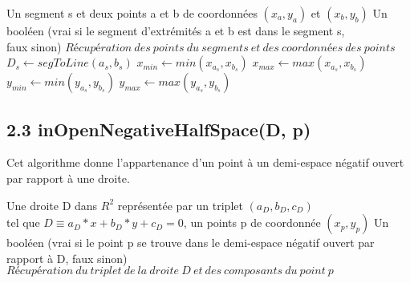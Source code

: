 \documentclass[a4paper,12pt]{report}	%
\begin{document}
	\begin{algorithm}
	\caption{$inSegment(s, a, b)$}
	\label{Modele pour un algo}
	\begin{algorithmic} [1]
	\REQUIRE Un segment s et deux points a et  b de coordonnées $(x_{a}, y_{a})$ et $(x_{b}, y_{b})$
	\ENSURE Un booléen (vrai si le segment d’extrémités a et b est dans le segment s, \\faux sinon)
	\STATE $Récupération\ des\ points\ du\ segments\ et\ des\ coordonnées\ des\ points$
	\STATE $D_{s} \gets segToLine(a_{s}, b_{s})$
	\STATE $ x_{min} \gets min(x_{a_{s}}, x_{b_{s}})$
	\STATE $ x_{max} \gets max(x_{a_{s}}, x_{b_{s}})$
	\STATE $ y_{min} \gets min(y_{a_{s}}, y_{b_{s}})$
	\STATE $ y_{max} \gets max(y_{a_{s}}, y_{b_{s}})$
	\RETURN \TRUE
	\ELSE 
	\RETURN \FALSE
	\ENDIF	
	\ENDIF
	\RETURN \FALSE
	\end{algorithmic}
	\end{algorithm}

	{\subsection*{2.3 inOpenNegativeHalfSpace(D, p)}}
	
	\noindent Cet algorithme donne l'appartenance d'un point à un demi-espace négatif ouvert par rapport à une droite.

	\begin{algorithm}
	\caption{$inOpenNegativeHalfSpace(D, p)$}
	\label{Modele pour un algo}
	\begin{algorithmic} [1]
	\REQUIRE Une droite D dans $R^2$ représentée par un triplet $(a_{D}, b_{D}, c_{D})$ \\tel que $D \equiv a_{D}*x + b_{D}*y + c_{D} = 0$, un points p de coordonnée $(x_{p}, y_{p})$
	\ENSURE Un booléen (vrai si le point  p se trouve dans le demi-espace négatif ouvert par rapport à D, faux sinon)
	\STATE $Récupération\ du\ triplet\ de\ la\ droite\ D\ et\ des\ composants\ du\ point\ p$
	\IF{$ a_{D}*x_{p} + b_{D}*y_{p} + c_{D} < 0 $}
	\RETURN \TRUE
	\ENDIF
	\RETURN \FALSE
	\end{algorithmic}
	\end{algorithm}
	
\end{document}
